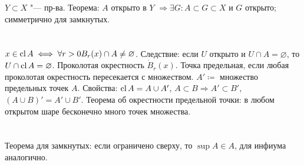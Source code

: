\section{} %
$Y \subset X$ "--- пр-ва.
Теорема: $A$ открыто в $Y$ $\Rightarrow \exists G: A \subset G \subset X$ и $G$ открыто; симметрично для замкнутых.

\section{} %
$x \in \operatorname{cl} A \iff \forall r>0 B_r(x) \cap A \neq \varnothing$.
Следствие: если $U$ открыто и $U \cap A = \varnothing$, то $U \cap \operatorname{cl} A = \varnothing$.
Проколотая окрестность $\dot B_r(x)$. Точка предельная, если любая проколотая окрестность пересекается с множеством.
$A' \coloneqq$ множество предельных точек $A$. Свойства: $\operatorname{cl} A = A \cup A'$, $A \subset B \Rightarrow A' \subset B'$, $(A\cup B)'=A'\cup B'$.
Теорема об окрестности предельной точки: в любом открытом шаре бесконечно много точек множества.

\section{} %
Теорема для замкнутых: если ограничено сверху, то $\sup A \in A$, для инфиума аналогично.
